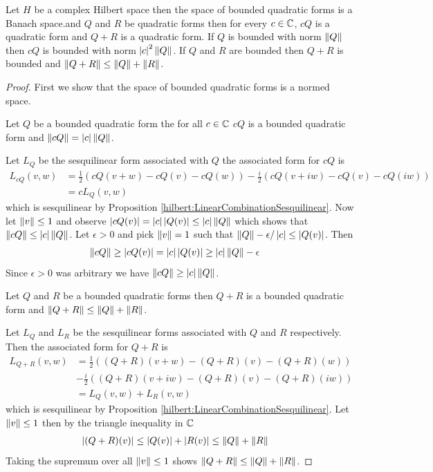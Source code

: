 \begin{prop}\label{hilbert:QuadraticFormsBanach}Let $H$ be a complex
  Hilbert space then the space of bounded quadratic forms is a Banach space.and $Q$ and $R$ be quadratic forms then for every $c \in \mathbb{C}$, $cQ$ is a quadratic form and $Q + R$ is a quadratic form.  If $Q$ is bounded with norm $\left \lVert Q \right \rVert$ then $cQ$ is bounded with norm $\left \vert c \right \vert^2\left \lVert Q \right \rVert$.  If $Q$ and $R$ are bounded then $Q+R$ is bounded and $\left \lVert Q+R \right \rVert \leq \left \lVert Q \right \rVert + \left \lVert R \right \rVert$. 
\end{prop}
\begin{proof}  First we show that the space of bounded quadratic forms
  is a normed space.
  \begin{clm} Let $Q$ be a bounded quadratic form the for all $c \in
    \mathbb{C}$ $cQ$ is a bounded quadratic form and $\left \lVert cQ \right \rVert =
    \left \vert c \right \vert \left \lVert Q \right \rVert$.
\end{clm}
Let $L_Q$ be the sesquilinear form associated with $Q$ the associated
form for $cQ$ is
\begin{align*}
L_{cQ}(v,w) &= \frac{1}{2} \left ( cQ(v+w) - cQ(v) - cQ(w) \right) -
              \frac{i}{2} \left (cQ(v+iw) - cQ(v) - cQ(iw) \right) \\
  &=c L_Q(v,w)
\end{align*}
which is sesquilinear by Proposition
\ref{hilbert:LinearCombinationSesquilinear}.   Now let $\left \lVert v \right \rVert \leq
1$ and observe $\left \vert cQ(v) \right \vert = \left \vert c \right \vert \left \vert Q(v) \right \vert \leq \left \vert c \right \vert
\left \lVert Q \right \rVert$ which shows that $\left \lVert cQ \right \rVert \leq \left \vert c \right \vert \left \lVert Q \right \rVert$.   Let
$\epsilon > 0$ and pick $\left \lVert v \right \rVert = 1$ such that $\left \lVert Q \right \rVert - \epsilon/\left \vert c \right \vert
\leq \left \vert Q(v) \right \vert$.   Then
\begin{align*}
  \left \lVert cQ \right \rVert &\geq \left \vert cQ(v) \right \vert = \left \vert c \right \vert \left \vert Q(v) \right \vert \geq
              \left \vert c \right \vert \left \lVert Q \right \rVert - \epsilon
\end{align*}
Since $\epsilon > 0$ was arbitrary we have $\left \lVert cQ \right \rVert \geq \left \vert c \right \vert \left \lVert Q \right \rVert$.
    
\begin{clm} Let $Q$ and $R$ be a bounded quadratic forms then $Q+R$ is a
  bounded quadratic form and $\left \lVert Q+R \right \rVert \leq \left \lVert Q \right \rVert + \left \lVert R \right \rVert$.
\end{clm}
Let $L_{Q}$ and $L_R$ be the sesquilinear forms associated with $Q$
and $R$ respectively.   Then the associated
form for $Q+R$ is
\begin{align*}
L_{Q+R}(v,w) &= \frac{1}{2} \left ( (Q + R)(v+w) - (Q + R)(v) - (Q +
               R)(w) \right) \\
  &- \frac{i}{2} \left ((Q + R)(v+iw) - (Q + R)(v) - (Q + R)(iw) \right) \\
  &=L_Q(v,w) + L_R(v,w)
\end{align*}
which is sesquilinear by Proposition
\ref{hilbert:LinearCombinationSesquilinear}.  Let $\left \lVert v \right \rVert \leq 1$
then by the triangle inequality in $\mathbb{C}$
\begin{align*}
\left \vert (Q+R)(v) \right \vert &\leq \left \vert Q(v) \right \vert + \left \vert R(v) \right \vert \leq \left \lVert Q \right \rVert +  \left \lVert R \right \rVert 
\end{align*}
Taking the supremum over all $\left \lVert v \right \rVert \leq 1$ shows $\left \lVert Q+R \right \rVert \leq
\left \lVert Q \right \rVert + \left \lVert R \right \rVert$.


\end{proof}
